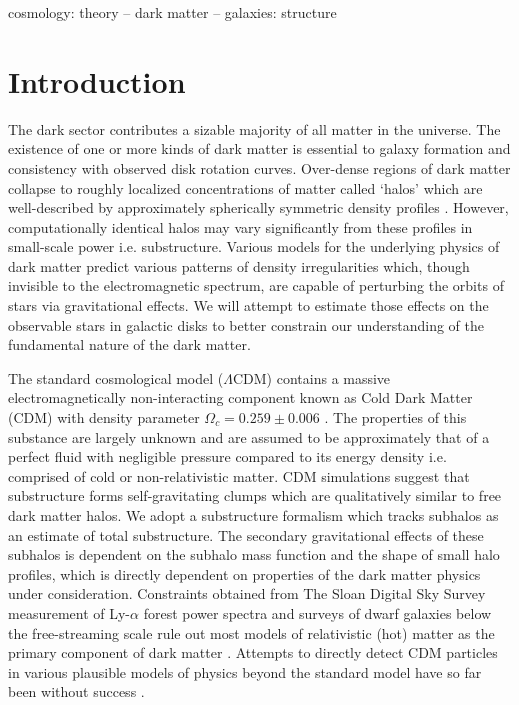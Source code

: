 \documentclass[usenatbib]{mnras}
\newcommand{\lcdm}{$\Lambda$CDM}
\begin{document}
\begin{keywords}
cosmology: theory -- dark matter -- galaxies: structure
\end{keywords}

\section{Introduction}

The dark sector contributes a sizable majority of all matter in the universe. The existence of one or more kinds of dark matter is essential to galaxy formation and consistency with observed disk rotation curves. Over-dense regions of dark matter collapse to roughly localized concentrations of matter called ‘halos’ which are well-described by approximately spherically symmetric density profiles \citep{structure}. However, computationally identical halos may vary significantly from these profiles in small-scale power i.e. substructure. Various models for the underlying physics of dark matter predict various patterns of density irregularities which, though invisible to the electromagnetic spectrum, are capable of perturbing the orbits of stars via gravitational effects. We will attempt to estimate those effects on the observable stars in galactic disks to better constrain our understanding of the fundamental nature of the dark matter.
             
\par 

The standard cosmological model (\lcdm) contains a massive electromagnetically non-interacting component known as Cold Dark Matter (CDM) with density parameter $\Omega_c = 0.259 \pm 0.006$ \citep{planck}. The properties of this substance are largely unknown and are assumed to be approximately that of a perfect fluid with negligible pressure compared to its energy density i.e. comprised of cold or non-relativistic matter. CDM simulations suggest that substructure forms self-gravitating clumps which are qualitatively similar to free dark matter halos. We adopt a substructure formalism which tracks subhalos as an estimate of total substructure. The secondary gravitational effects of these subhalos is dependent on the subhalo mass function and the shape of small halo profiles, which is directly dependent on properties of the dark matter physics under consideration. Constraints obtained from The Sloan Digital Sky Survey measurement of Ly-$\alpha$ forest power spectra and surveys of dwarf galaxies below the free-streaming scale rule out most models of relativistic (hot) matter as the primary component of dark matter \citep{can_neutrinos}. Attempts to directly detect CDM particles in various plausible models of physics beyond the standard model have so far been without success \citep{direct_detection}.
	  
\end{document}
